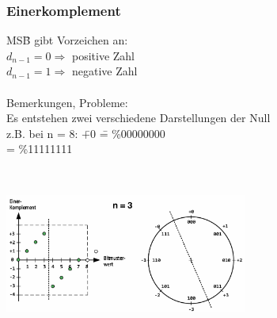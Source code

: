 \subsubsection{Einerkomplement}
\vspace{-2ex}
\begin{minipage}{9cm}
	\begin{tabbing}
		MS\=B gibt  Vorzeichen an:\\
		\> $d_{n-1} = 0 \Rightarrow$ positive Zahl\\
		\> $d_{n-1} = 1 \Rightarrow$ negative Zahl\\\\
		
		Bemerkungen, Probleme:\\
		\> Es entstehen zwei verschiedene Darstellungen der Null\\
		\> z.B. bei n = 8: \= +0 \= = \%00000000\\
						\> \> -0 \> = \%11111111
		
	\end{tabbing}
\end{minipage}
%
\begin{minipage}{0.5cm}
	\ \
\end{minipage}
%
\begin{minipage}{9cm}
	\includegraphics[width=8cm]{pics/Ones_Complement}
\end{minipage}

